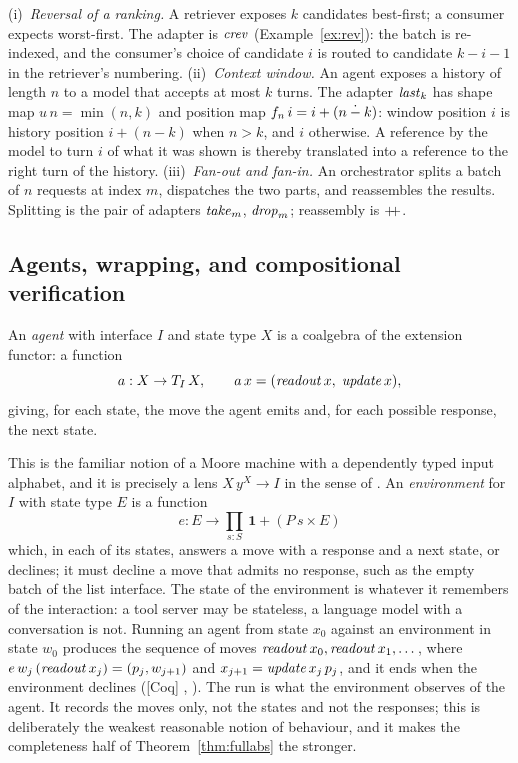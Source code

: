 \documentclass{fundam}
\begin{document}
\begin{example}\label{ex:adapters}
  (i)~\emph{Reversal of a ranking.}  A retriever exposes $k$ candidates best-first; a
  consumer expects worst-first.  The adapter is $\mathit{crev}$ (Example~\ref{ex:rev}): the
  batch is re-indexed, and the consumer's choice of candidate $i$ is routed to candidate
  $k - i - 1$ in the retriever's numbering.
  (ii)~\emph{Context window.}  An agent exposes a history of length $n$ to a model that
  accepts at most $k$ turns.  The adapter $\mathit{last}_k$ has shape map
  $u\,n = \min(n,k)$ and position map $f_n\,i = i + (n \mathbin{\dot{-}} k)$: window position $i$
  is history position $i + (n - k)$ when $n > k$, and $i$ otherwise.  A reference by the
  model to turn $i$ of what it was shown is thereby translated into a reference to the
  right turn of the history.
  (iii)~\emph{Fan-out and fan-in.}  An orchestrator splits a batch of $n$ requests at
  index $m$, dispatches the two parts, and reassembles the results.  Splitting is the pair
  of adapters $\mathit{take}_m$, $\mathit{drop}_m$; reassembly is $\mathbin{+\!\!+}$.
\end{example}

\subsection{Agents, wrapping, and compositional verification}\label{sec:wrapping}

\begin{definition}[Agent]\label{def:agent}
  An \emph{agent} with interface $I$ and state type $X$ is a coalgebra of the extension
  functor: a function
  \[
    a : X \to T_{I}\,X, \qquad a\,x = (\mathit{readout}\,x,\; \mathit{update}\,x),
  \]
  giving, for each state, the move the agent emits and, for each possible response, the
  next state.
\end{definition}

This is the familiar notion of a Moore machine with a dependently typed input alphabet,
and it is precisely a lens $X\,y^X \to I$ in the sense of \cite{NiuSpivak25}.  An
\emph{environment} for $I$ with state type $E$ is a function
\[
  e : E \to \textstyle\prod_{s:S}\, \mathbf{1} + (P\,s \times E)
\]
which, in each of its states, answers a move with a response and a next state, or
declines; it must decline a move that admits no response, such as the empty batch of the
list interface.  The state of the environment is whatever it remembers of the
interaction: a tool server may be stateless, a language model with a conversation is
not.  Running an agent from state $x_0$ against an environment in state $w_0$ produces
the sequence of moves $\mathit{readout}\,x_0, \mathit{readout}\,x_1, \dots$, where
$e\,w_j\,(\mathit{readout}\,x_j) = (p_j, w_{j+1})$ and $x_{j+1} = \mathit{update}\,x_j\,p_j$, and
it ends when the environment declines (\textsf{[Coq]} , ).  The run is
what the environment observes of the agent.  It records the moves only, not the states
and not the responses; this is deliberately the weakest reasonable notion of behaviour,
and it makes the completeness half of Theorem~\ref{thm:fullabs} the stronger.
\end{document}
